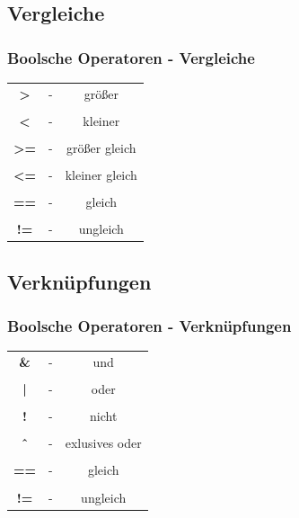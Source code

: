 \documentclass[final]{beamer}
\begin{document}
\subsection{Vergleiche}
\begin{frame}
	\frametitle{Boolsche Operatoren - Vergleiche}
	\begin{tabular}{c c c}
		\textbf{>}  & - & größer \\&&\\
		\textbf{<} & - & kleiner \\&&\\
		\textbf{>=} & - & größer gleich \\&&\\
		\textbf{<=}  & - &  kleiner gleich \\&&\\
		\textbf{==} & - & gleich \\&&\\
		\textbf{!=} & - & ungleich \\
	\end{tabular}
\end{frame}

\subsection{Verknüpfungen}
\begin{frame}
	\frametitle{Boolsche Operatoren - Verknüpfungen}
	\begin{tabular}{c c c}
		\textbf{\&}  & - & und \\&&\\
		\textbf{|} & - & oder \\&&\\
		\textbf{!} & - & nicht \\&&\\
		\textbf{\^\ }  & - &  exlusives oder \\&&\\
		\textbf{==} & - & gleich \\&&\\
		\textbf{!=} & - & ungleich \\
	\end{tabular}
\end{frame}
\end{document}
